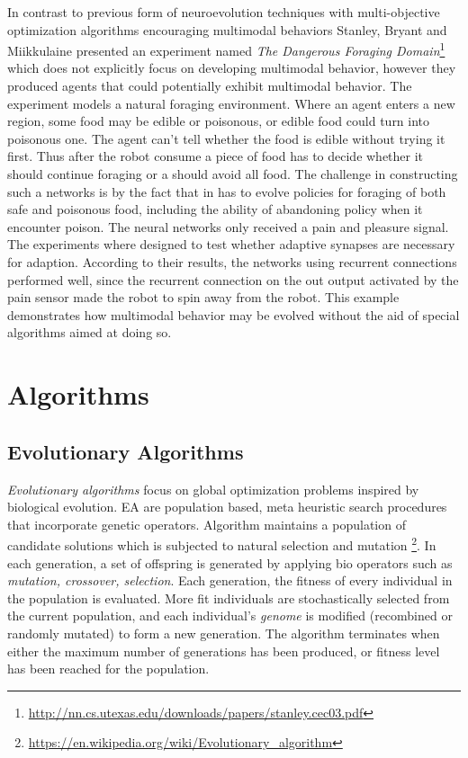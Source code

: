 \documentclass[format=acmsmall, review=false, screen=true]{acmart}
\begin{document}
In contrast to previous form of neuroevolution techniques with multi-objective optimization algorithms encouraging multimodal behaviors Stanley, Bryant and Miikkulaine presented an experiment named \emph{The Dangerous Foraging Domain}\footnote{\url{http://nn.cs.utexas.edu/downloads/papers/stanley.cec03.pdf}} which does not explicitly focus on developing multimodal behavior, however they produced agents that could potentially exhibit multimodal behavior. The experiment models a natural foraging environment. Where an agent enters a new region, some food may be edible or poisonous, or edible food could turn into poisonous one. The agent can't tell whether the food is edible without trying it first. Thus after the robot consume a piece of food has to decide whether it should continue foraging or a should avoid all food. The challenge in constructing such a networks is by the fact that in has to evolve policies for foraging of both safe and poisonous food, including the ability of abandoning policy when it encounter poison. The neural networks only received a pain and pleasure signal. The experiments where designed to test whether adaptive synapses are necessary for adaption. According to their results, the networks using recurrent connections performed well, since the recurrent connection on the out output activated by the pain sensor made the robot to spin away from the robot. This example demonstrates how multimodal behavior may be evolved without the aid of special algorithms aimed at doing so.

\section{Algorithms}

\subsection{Evolutionary Algorithms}

\emph{Evolutionary algorithms} focus on global optimization problems inspired by biological evolution. EA are population based, meta heuristic search procedures that incorporate genetic operators. Algorithm maintains a population of candidate solutions which is subjected to natural selection and mutation \footnote{\url{https://en.wikipedia.org/wiki/Evolutionary_algorithm}}. In each generation, a set of offspring is generated by applying bio operators such as \emph{mutation, crossover, selection}. Each generation, the fitness of every individual in the population is evaluated. More fit individuals are stochastically selected from the current population, and each individual's \emph{genome} is modified (recombined or randomly mutated) to form a new generation. The algorithm terminates when either the maximum number of generations has been produced, or fitness level has been reached for the population.
\end{document}
